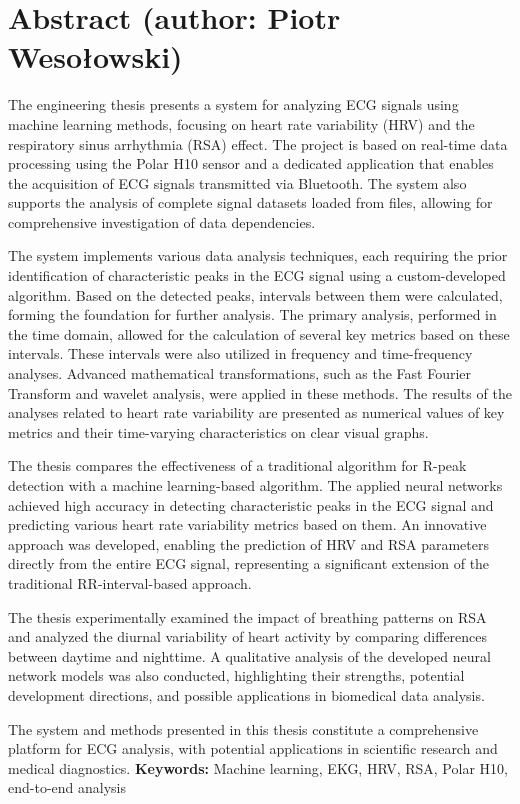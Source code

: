 \chapter*{Abstract \small{(author: Piotr Wesołowski)}}
\indent The engineering thesis presents a system for analyzing ECG signals using machine learning methods, focusing on heart rate variability (HRV) and the respiratory sinus arrhythmia (RSA) effect. The project is based on real-time data processing using the Polar H10 sensor and a dedicated application that enables the acquisition of ECG signals transmitted via Bluetooth. The system also supports the analysis of complete signal datasets loaded from files, allowing for comprehensive investigation of data dependencies.

The system implements various data analysis techniques, each requiring the prior identification of characteristic peaks in the ECG signal using a custom-developed algorithm. Based on the detected peaks, intervals between them were calculated, forming the foundation for further analysis. The primary analysis, performed in the time domain, allowed for the calculation of several key metrics based on these intervals. These intervals were also utilized in frequency and time-frequency analyses. Advanced mathematical transformations, such as the Fast Fourier Transform and wavelet analysis, were applied in these methods. The results of the analyses related to heart rate variability are presented as numerical values of key metrics and their time-varying characteristics on clear visual graphs.

The thesis compares the effectiveness of a traditional algorithm for R-peak detection with a machine learning-based algorithm. The applied neural networks achieved high accuracy in detecting characteristic peaks in the ECG signal and predicting various heart rate variability metrics based on them. An innovative approach was developed, enabling the prediction of HRV and RSA parameters directly from the entire ECG signal, representing a significant extension of the traditional RR-interval-based approach.

The thesis experimentally examined the impact of breathing patterns on RSA and analyzed the diurnal variability of heart activity by comparing differences between daytime and nighttime. A qualitative analysis of the developed neural network models was also conducted, highlighting their strengths, potential development directions, and possible applications in biomedical data analysis.

The system and methods presented in this thesis constitute a comprehensive platform for ECG analysis, with potential applications in scientific research and medical diagnostics.
\vspace{0.5cm}\newline
\textbf{Keywords:} Machine learning, EKG, HRV, RSA, Polar H10, end-to-end analysis \vspace{0.5cm}